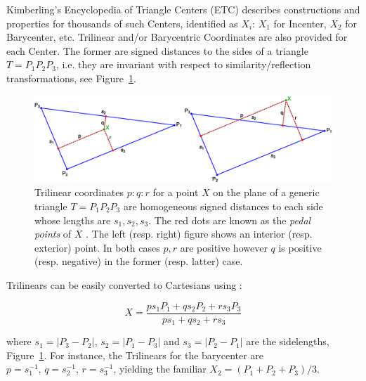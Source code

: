 Kimberling's Encyclopedia of Triangle Centers (ETC) \cite{etc} describes constructions and properties for thousands of such Centers, identified as $X_i$: $X_1$ for Incenter, $X_2$ for Barycenter, etc. Trilinear and/or Barycentric Coordinates are also provided for each Center. The former are signed distances to the sides of a triangle $T=P_1P_2P_3$, i.e. they are invariant with respect to similarity/reflection transformations, see Figure~\ref{fig:trilins}.

\begin{figure}
    \centering
    \includegraphics[width=\textwidth]{pics_1120_trilins.eps}
    \caption{Trilinear coordinates $p:q:r$ for a point $X$ on the plane of a generic triangle $T=P_1P_2P_3$ are homogeneous signed distances to each side whose lengths are $s_1,s_2,s_3$. The red dots are known as the {\em pedal points} of $X$ \cite{mw}. The left (resp. right) figure shows an interior (resp. exterior) point. In both cases $p,r$ are positive however $q$ is positive (resp. negative) in the former (resp. latter) case.}
    \label{fig:trilins}
\end{figure}

Trilinears can be easily converted to Cartesians using \cite{mw}:

\begin{equation}
\label{eqn:trilin-cartesian}
X=\frac{p s_1 P_1 + q s_2 P_2 + r s_3 P_3}{p{s_1}+q{s_2}+r{s_3}}
\end{equation}

\noindent where $s_1=|P_3-P_2|$, $s_2=|P_1-P_3|$ and $s_3=|P_2-P_1|$ are the sidelengths, Figure~\ref{fig:trilins}.
For instance, the Trilinears for the barycenter are $p = s_1^{-1},\,q = s_2^{-1},\,r = s_3^{-1}$, yielding the familiar $X_2 = (P_1+P_2+P_3)/3$.


